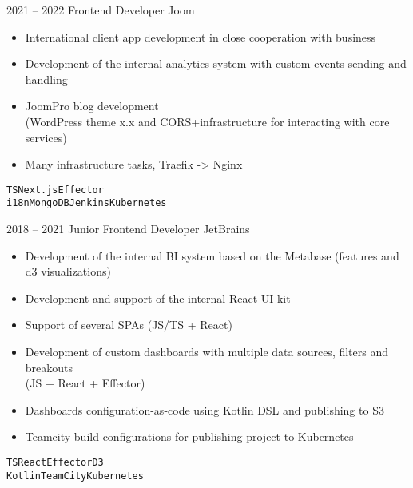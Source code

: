\documentclass[9pt]{template}
\begin{document}
\begin{entrylist}
	\entry
	{2021 -- 2022}
	{Frontend Developer}
	{Joom}
	{
	        \begin{itemize}[noitemsep,topsep=5pt,leftmargin=8pt]
		        \item International client app development in close cooperation with business
		        \item Development of the internal analytics system with custom events sending and handling
			\item JoomPro blog development\\ (WordPress theme x.x and CORS+infrastructure for interacting with core services)
		        \item Many infrastructure tasks, Traefik -> Nginx
		\end{itemize}
		\texttt{TS}\slashsep\texttt{Next.js}\slashsep\texttt{Effector}\\
		\texttt{i18n}\slashsep\texttt{MongoDB}\slashsep\texttt{Jenkins}\slashsep\texttt{Kubernetes}}
	\entry
	{2018 -- 2021}
	{Junior Frontend Developer}
	{JetBrains}
	{
	        \begin{itemize}[noitemsep,topsep=5pt,leftmargin=8pt]
		        \item Development of the internal BI system based on the Metabase (features and d3 visualizations)
		        \item Development and support of the internal React UI kit
		        \item Support of several SPAs (JS/TS + React)
		        \item Development of custom dashboards with multiple data sources, filters and breakouts\\ (JS + React + Effector)\\ 
		        \item Dashboards configuration-as-code using Kotlin DSL and publishing to S3
		        \item Teamcity build configurations for publishing project to Kubernetes
		\end{itemize}
		\texttt{TS}\slashsep\texttt{React}\slashsep\texttt{Effector}\slashsep\texttt{D3}\\
		\texttt{Kotlin}\slashsep\texttt{TeamCity}\slashsep\texttt{Kubernetes}}
\end{entrylist}
\end{document}

